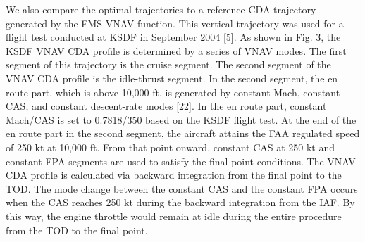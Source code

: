 \documentclass{aer1315-pretty}
\begin{document}
\begin{itemize}
We also compare the optimal trajectories to a reference CDA
trajectory generated by the FMS VNAV function. This vertical
trajectory was used for a flight test conducted at KSDF in
September 2004 [5]. As shown in Fig. 3, the KSDF VNAV CDA
profile is determined by a series of VNAV modes. The first segment of this trajectory is the cruise segment. The second segment of the
VNAV CDA profile is the idle-thrust segment. In the second segment,
the en route part, which is above 10,000 ft, is generated by constant
Mach, constant CAS, and constant descent-rate modes [22]. In the en
route part, constant Mach/CAS is set to 0.7818/350 based on the
KSDF flight test. At the end of the en route part in the second
segment, the aircraft attains the FAA regulated speed of 250 kt at
10,000 ft. From that point onward, constant CAS at 250 kt and
constant FPA segments are used to satisfy the final-point conditions.
The VNAV CDA profile is calculated via backward integration from
the final point to the TOD. The mode change between the constant
CAS and the constant FPA occurs when the CAS reaches 250 kt
during the backward integration from the IAF. By this way, the engine
throttle would remain at idle during the entire procedure from the
TOD to the final point.



\end{itemize}
\end{document}
